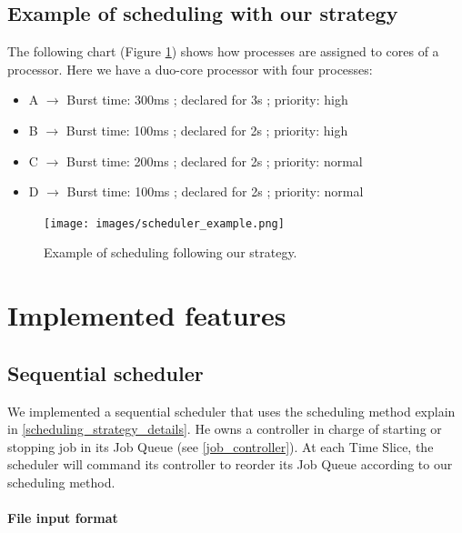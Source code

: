 \documentclass[a4paper,11pt]{article}
\begin{document}
\subsection{Example of scheduling with our strategy}

The following chart (Figure \ref{scheduling_example}) shows how processes are assigned to cores of a processor. Here we have a duo-core processor with four processes:

\begin{itemize}
\item A $\rightarrow$ Burst time: 300ms ; declared for 3s ; priority: high
\item B $\rightarrow$ Burst time: 100ms ; declared for 2s ; priority: high
\item C $\rightarrow$ Burst time: 200ms ; declared for 2s ; priority: normal
\item D $\rightarrow$ Burst time: 100ms ; declared for 2s ; priority: normal
\end{itemize}

\begin{center}
\begin{figure}[ht]
\texttt{[image: images/scheduler\_example.png]}
\caption{Example of scheduling following our strategy.}
\label{scheduling_example}
\end{figure}
\end{center}

\clearpage

\section{Implemented features}

\subsection{Sequential scheduler}

We implemented a sequential scheduler that uses the scheduling method explain in \ref{scheduling_strategy_details}. He owns a controller in charge of starting or stopping job in its Job Queue (see \ref{job_controller}). At each Time Slice, the scheduler will command its controller to reorder its Job Queue according to our scheduling method.

\paragraph{File input format}\label{file_format}
\end{document}
